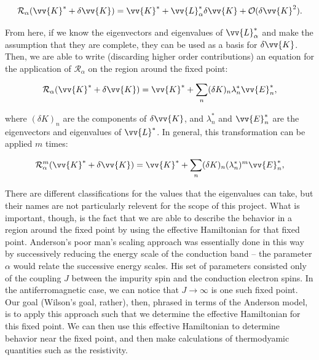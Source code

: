\begin{equation}
  \mathcal{R}_\alpha(\vv{K}^* + \delta\vv{K}) = \vv{K}^* + \vv{L}^*_\alpha\delta\vv{K} + \mathcal{O}(\delta\vv{K}^2).
\end{equation}

From here, if we know the eigenvectors and eigenvalues of $\vv{L}_\alpha^*$ and make the assumption that they are complete, they can be used as a basis for $\delta\vv{K}$. Then, we are able to write (discarding higher order contributions) an equation for the application of $\mathcal{R}_\alpha$ on the region around the fixed point:

\begin{equation}
  \mathcal{R}_\alpha(\vv{K}^* + \delta\vv{K}) = \vv{K}^* + \sum_n (\delta K)_n \lambda^*_n \vv{E}^*_n,
\end{equation}

where $(\delta K)_n$ are the components of $\delta\vv{K}$, and $\lambda^*_n$ and $\vv{E}^*_n$ are the eigenvectors and eigenvalues of $\vv{L}^*$. In general, this transformation can be applied $m$ times:

\begin{equation}
  \mathcal{R}^m_\alpha(\vv{K}^* + \delta\vv{K}) = \vv{K}^* + \sum_n (\delta K)_n (\lambda^*_n)^m \vv{E}^*_n,
\end{equation}

There are different classifications for the values that the eigenvalues can take, but their names are not particularly relevent for the scope of this project. What is important, though, is the fact that we are able to describe the behavior in a region around the fixed point by using the effective Hamiltonian for that fixed point. Anderson's poor man's scaling approach was essentially done in this way by successively reducing the energy scale of the conduction band -- the parameter $\alpha$ would relate the successive energy scales. His set of parameters consisted only of the coupling $J$ between the impurity spin and the conduction electron spins. In the antiferromagnetic case, we can notice that $J \rightarrow \infty$ is one such fixed point. Our goal (Wilson's goal, rather), then, phrased in terms of the Anderson model, is to apply this approach such that we determine the effective Hamiltonian for this fixed point. We can then use this effective Hamiltonian to determine behavior near the fixed point, and then make calculations of thermodyamic quantities such as the resistivity.

